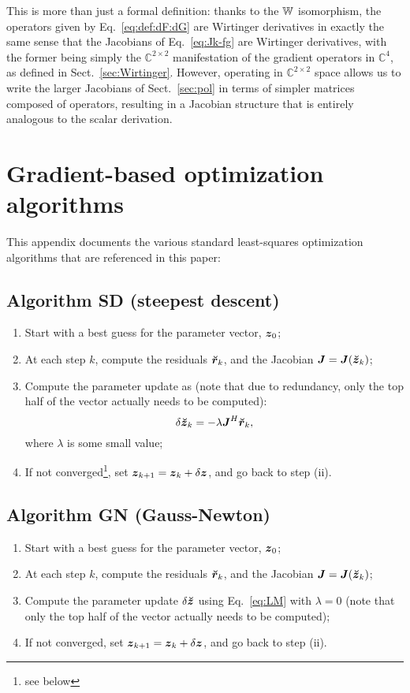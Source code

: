 \documentclass[useAMS,usenatbib]{mn2e}
\newcommand{\COMPLEX}{\mathbb{C}}
\newcommand{\zz}{\bmath{z}}
\newcommand{\mat}[1]{{\bmath{#1}}}
\newcommand{\JJ}{\mat{J}} %
\newcommand{\AUG}[1]{\bmath{\breve{#1}}}
\newcommand{\Zz}{\AUG{z}}
\newcommand{\Rr}{\AUG{r}}
\numberwithin{equation}{section}
\begin{document}
This is more than just a formal definition: thanks to the $\mathbb{W}$ isomorphism, the operators 
given by Eq.~\ref{eq:def:dF:dG} are Wirtinger derivatives in exactly the same sense that the Jacobians of 
Eq.~\ref{eq:Jk-fg} are Wirtinger derivatives, with the former being simply the $\COMPLEX^{2\times2}$ manifestation of
the gradient operators in $\COMPLEX^4$, as defined in Sect.~\ref{sec:Wirtinger}. However, operating in 
$\COMPLEX^{2\times2}$ space allows us to write the larger Jacobians of Sect.~\ref{sec:pol} 
in terms of simpler matrices composed of operators, resulting in a Jacobian structure that is entirely analogous
to the scalar derivation.


\section{Gradient-based optimization algorithms}
\label{sec:algs}

This appendix documents the various standard least-squares optimization algorithms 
that are referenced in this paper:

\subsection{Algorithm SD (steepest descent)}

\begin{enumerate}
\item Start with a best guess for the parameter vector, $\bmath{z}_0$;
\item At each step $k$, compute the residuals $\Rr_k$, and the Jacobian
$\JJ=\JJ(\Zz_k)$;
\item Compute the parameter update as (note that due to redundancy, only the top half of the vector actually needs
to be computed):
\begin{equation}
\delta\Zz_k = - \lambda \JJ^H \Rr_k,
\end{equation}
where $\lambda$ is some small value;
\item If not converged\footnote{see below}, set $\bmath{z}_{k+1}=\bmath{z}_k+\delta\zz$, and go back to step (ii).
\end{enumerate}

\subsection{Algorithm GN (Gauss-Newton)}

\begin{enumerate}
\item Start with a best guess for the parameter vector, $\bmath{z}_0$;
\item At each step $k$, compute the residuals $\Rr_k$, and the Jacobian
$\JJ=\JJ(\Zz_k)$;
\item Compute the parameter update $\delta\Zz$ using Eq.~\ref{eq:LM} with $\lambda=0$ (note that only the top half of the vector actually needs to be computed);
\item If not converged, set $\bmath{z}_{k+1}=\bmath{z}_k+\delta\zz$, and go back to step (ii).
\end{enumerate}
\end{document}
